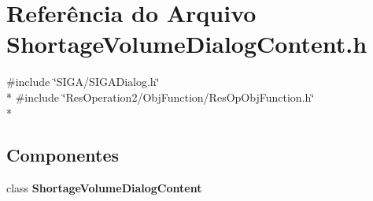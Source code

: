 \section{Referência do Arquivo Shortage\+Volume\+Dialog\+Content.\+h}
\label{_2_obj_function_2_shortage_volume_2_shortage_volume_dialog_content_8h}
{\ttfamily \#include \char`\"{}S\+I\+G\+A/\+S\+I\+G\+A\+Dialog.\+h\char`\"{}}\\*
{\ttfamily \#include \char`\"{}Res\+Operation2/\+Obj\+Function/\+Res\+Op\+Obj\+Function.\+h\char`\"{}}\\*
\subsection*{Componentes}
\begin{DoxyCompactItemize}
\item 
class {\bf Shortage\+Volume\+Dialog\+Content}
\end{DoxyCompactItemize}
